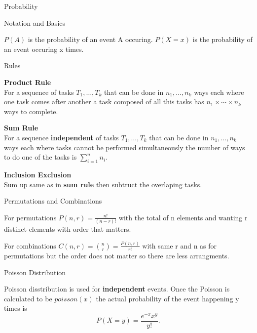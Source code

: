 \documentclass[12pt, letterpaper]{article}
\begin{document}
\begin{section}{Probability}

  \begin{subsection}{Notation and Basics}

    \(P(A)\) is the probability of an event A occuring. \(P(X = x)\) is the probability
    of an event occuring x times.

    \begin{subsubsection}{Rules}

      \textbf{Product Rule} \\
      For a sequence of tasks \(T_{1}, \dots , T_{k}\) that can be done in
      \(n_{1}, \dots , n_{k}\) ways each where one task comes after another
      a task composed of all this tasks has \(n_{1} \times \cdots \times n_{k}\)
      ways to complete.

      \textbf{Sum Rule} \\
      For a sequence \textbf{independent} of tasks \(T_{1}, \dots , T_{k}\)
      that can be done in \(n_{1}, \dots , n_{k}\) ways each where tasks cannot
      be performed simultaneously the number of ways to do one of the tasks is
      \(\sum_{i = 1}^{n}n_{i}\).

      \textbf{Inclusion Exclusion} \\
      Sum up same as in \textbf{sum rule} then subtruct the overlaping tasks.

    \end{subsubsection}

  \end{subsection}

  \begin{subsection}{Permutations and Combinations}

    For permutations \(P(n, r) =  \frac{n!}{(n - r)!}\) with the total of n
    elements and wanting r distinct elements with order that matters.

    For combinations \(C(n, r) = \binom{n}{r} = \frac{P(n, r)}{r!}\) with same
    r and n as for permutations but the order does not matter so there are less
    arrangments.

  \end{subsection}

  \begin{subsection}{Poisson Distribution}

    Poisson disstribution is used for \textbf{independent} events.
    Once the Poisson is calculated to be \(\textit{poisson}(x)\) the actual
    probability of the event happening y times is
    \[P(X = y) = \frac{e^{-x}x^{y}}{y!}.\]


\end{subsection}
\end{section}
\end{document}
